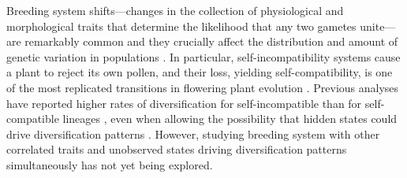 Breeding system shifts---changes in the collection of physiological and morphological traits that determine the likelihood that any two gametes unite---are remarkably common and they crucially affect the distribution and amount of genetic variation in populations \citep{stebbins1974, barrett2013}.
In particular, self-incompatibility systems cause a plant to reject its own pollen, and their loss, yielding self-compatibility, is one of the most replicated transitions in flowering plant evolution \citep{stebbins1974,igic_2008}. %
Previous analyses have reported higher rates of diversification for self-incompatible than for self-compatible lineages \citep{goldberg_2010, devos2014}, even when allowing the possibility that hidden states could drive diversification patterns \citep{freyman_2018}.
However, studying breeding system with other correlated traits and unobserved states driving diversification patterns simultaneously has not yet being explored. %

